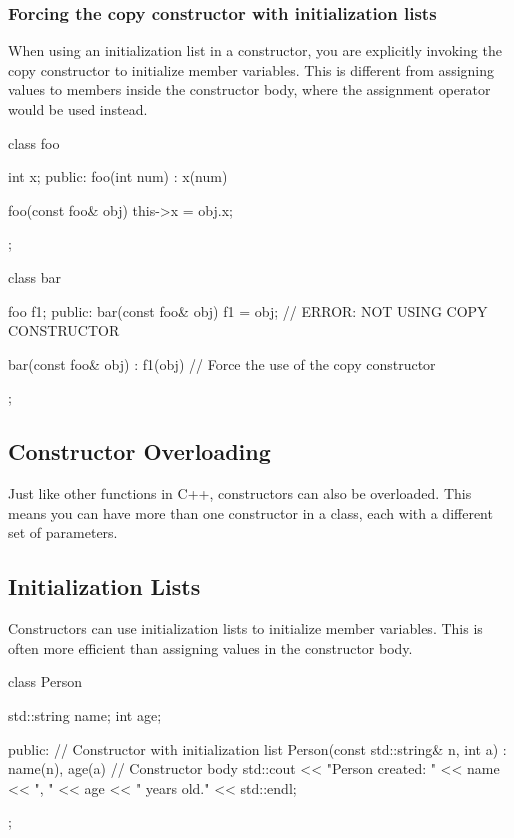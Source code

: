 \documentclass{report}
\begin{document}
    \bigbreak \noindent 
    \subsubsection{Forcing the copy constructor with initialization lists}
    \bigbreak \noindent 
    When using an initialization list in a constructor, you are explicitly invoking the copy constructor to initialize member variables. This is different from assigning values to members inside the constructor body, where the assignment operator would be used instead. 
    \bigbreak \noindent 
    \begin{cppcode}
class foo {
    int x;
public:
    foo(int num) : x(num) {}

    foo(const foo& obj) { this->x = obj.x; }
};

class bar {
    foo f1;
public:
    bar(const foo& obj) { f1 = obj; } // ERROR: NOT USING COPY CONSTRUCTOR

    bar(const foo& obj) : f1(obj) { } // Force the use of the copy constructor
};
    \end{cppcode}

    \bigbreak \noindent 
    \subsection{Constructor Overloading}
    \bigbreak \noindent 
    \begin{concept}
        Just like other functions in C++, constructors can also be overloaded. This means you can have more than one constructor in a class, each with a different set of parameters.
    \end{concept}

    \pagebreak
    \subsection{Initialization Lists}
    \bigbreak \noindent 
    \begin{concept}
        Constructors can use initialization lists to initialize member variables. This is often more efficient than assigning values in the constructor body.
    \end{concept}
    \bigbreak \noindent 
    \begin{cppcode}
  class Person {
    std::string name;
    int age;

public:
    // Constructor with initialization list
    Person(const std::string& n, int a) : name(n), age(a) {
        // Constructor body
        std::cout << "Person created: " << name << ", " << age << " years old." << std::endl;
    }  
};
    \end{cppcode}
\end{document}
